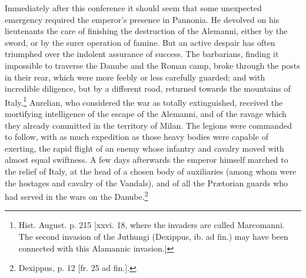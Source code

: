 Immediately after this conference it should seem that some unexpected emergency required the emperor\texthebrew{}’s presence in Pannonia. He devolved on his lieutenants the care of finishing the destruction of the Alemanni, either by the sword, or by the surer operation of famine. But an active despair has often triumphed over the indolent assurance of success. The barbarians, finding it impossible to traverse the Danube and the Roman camp, broke through the posts in their rear, which were more feebly or less carefully guarded; and with incredible diligence, but by a different road, returned towards the mountains of Italy.\footnote{Hist. August. p. 215 [xxvi. 18, where the invaders are called Marcomanni. The second invasion of the Juthungi (Dexippus, ib. ad fin.) may have been connected with this Alamannic invasion.]} Aurelian, who considered the war as totally extinguished, received the mortifying intelligence of the escape of the Alemanni, and of the ravage which they already committed in the territory of Milan. The legions were commanded to follow, with as much expedition as those heavy bodies were capable of exerting, the rapid flight of an enemy whose infantry and cavalry moved with almost equal swiftness. A few days afterwards the emperor himself marched to the relief of Italy, at the head of a chosen body of auxiliaries (among whom were the hostages and cavalry of the Vandals), and of all the Prætorian guards who had served in the wars on the Danube.\footnote{Dexippus, p. 12 [fr. 25 ad fin.].}

